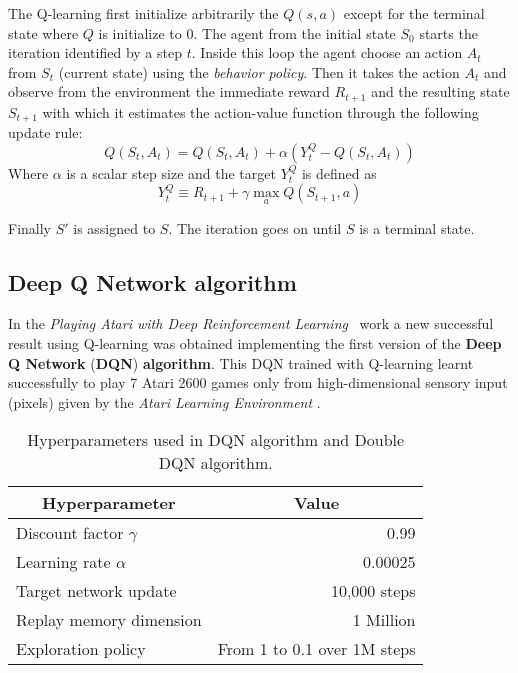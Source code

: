 The Q-learning first initialize arbitrarily the $Q(s,a)$ except for the terminal state where $Q$ is initialize to 0.
The agent from the initial state $S_0$ starts the iteration identified by a step $t$. Inside this loop the agent choose an action $A_t$ from $S_t$ (current state) using the \textit{behavior policy}. Then it takes the action $A_t$ and observe from the environment the immediate reward $R_{t+1}$ and the resulting state $S_{t+1}$ with which it estimates the action-value function through the following update rule:
\begin{equation}
	Q(S_t, A_t) = Q(S_t, A_t) + \alpha (Y^Q_t - Q(S_t, A_t))
\end{equation}
Where $\alpha$ is a scalar step size and the target $Y^Q_t$ is defined as
\begin{equation}
	Y^Q_t \equiv R_{t+1} + \gamma \max_{a} Q(S_{t+1}, a)
\end{equation}

Finally $S'$ is assigned to $S$. The iteration goes on until $S$ is a terminal state.

\subsection{Deep Q Network algorithm}
\label{subsec:DQN}

In the \textit{Playing Atari with Deep Reinforcement Learning}~\cite{DBLP:journals/corr/MnihKSGAWR13} work a new successful result using Q-learning was obtained implementing the first version of the \textbf{Deep Q Network} (\textbf{DQN}) \textbf{algorithm}. This DQN trained with Q-learning learnt successfully to play 7 Atari 2600 games only from high-dimensional sensory input (pixels) given by the \textit{Atari Learning Environment} \cite{ArcadeLearningEnvironment}.

\begin{table}[]
	\centering
	\begin{tabular}{|l|r|}
		\hline
		\multicolumn{1}{|c|}{\textbf{Hyperparameter}} &
		\multicolumn{1}{|c|}{\textbf{Value}}        \\
		\hline
		Discount factor $\gamma$ & 0.99                        \\
		Learning rate $\alpha$   & 0.00025                     \\
		Target network update    & 10,000 steps                \\
		Replay memory dimension  & 1 Million                   \\
		Exploration policy       & From 1 to 0.1 over 1M steps \\
		\hline
	\end{tabular}
	\caption{Hyperparameters used in DQN algorithm and Double DQN algorithm.}
	\label{fig:dqn-hyperparams}
\end{table}

